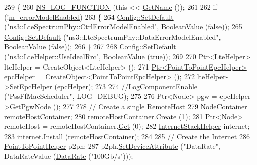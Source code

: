 \begin{DoxyCode}
259 \{
260   \hyperlink{log-macros-disabled_8h_a90b90d5bad1f39cb1b64923ea94c0761}{NS\_LOG\_FUNCTION} (\textcolor{keyword}{this} << \hyperlink{classns3_1_1TestCase_a28f7bb59669c24dae1c290fc17fc9b62}{GetName} ());
261 
262   \textcolor{keywordflow}{if} (!\hyperlink{classLenaPssFfMacSchedulerTestCase1_a6b9a830f183e1d99a4aa038bba09132a}{m\_errorModelEnabled})
263     \{
264       \hyperlink{group__config_ga2e7882df849d8ba4aaad31c934c40c06}{Config::SetDefault} (\textcolor{stringliteral}{"ns3::LteSpectrumPhy::CtrlErrorModelEnabled"}, 
      \hyperlink{classns3_1_1BooleanValue}{BooleanValue} (\textcolor{keyword}{false}));
265       \hyperlink{group__config_ga2e7882df849d8ba4aaad31c934c40c06}{Config::SetDefault} (\textcolor{stringliteral}{"ns3::LteSpectrumPhy::DataErrorModelEnabled"}, 
      \hyperlink{classns3_1_1BooleanValue}{BooleanValue} (\textcolor{keyword}{false}));
266     \}
267 
268   \hyperlink{group__config_ga2e7882df849d8ba4aaad31c934c40c06}{Config::SetDefault} (\textcolor{stringliteral}{"ns3::LteHelper::UseIdealRrc"}, 
      \hyperlink{classns3_1_1BooleanValue}{BooleanValue} (\textcolor{keyword}{true}));
269 
270   \hyperlink{classns3_1_1Ptr}{Ptr<LteHelper>} lteHelper = CreateObject<LteHelper> ();
271   \hyperlink{classns3_1_1Ptr}{Ptr<PointToPointEpcHelper>}  epcHelper = CreateObject<PointToPointEpcHelper> ();
272   lteHelper->\hyperlink{classns3_1_1LteHelper_a324079a1ccd54ce949786b83d6b95915}{SetEpcHelper} (epcHelper);
273 
274   \textcolor{comment}{//LogComponentEnable ("PssFfMacScheduler", LOG\_DEBUG);}
275 
276   \hyperlink{classns3_1_1Ptr}{Ptr<Node>} pgw = epcHelper->GetPgwNode ();
277 
278   \textcolor{comment}{// Create a single RemoteHost}
279   \hyperlink{classns3_1_1NodeContainer}{NodeContainer} remoteHostContainer;
280   remoteHostContainer.\hyperlink{classns3_1_1NodeContainer_a787f059e2813e8b951cc6914d11dfe69}{Create} (1);
281   \hyperlink{classns3_1_1Ptr}{Ptr<Node>} remoteHost = remoteHostContainer.\hyperlink{classns3_1_1NodeContainer_a9ed96e2ecc22e0f5a3d4842eb9bf90bf}{Get} (0);
282   \hyperlink{classns3_1_1InternetStackHelper}{InternetStackHelper} internet;
283   internet.\hyperlink{classns3_1_1InternetStackHelper_a6645b412f31283d2d9bc3d8a95cebbc0}{Install} (remoteHostContainer);
284 
285   \textcolor{comment}{// Create the Internet}
286   \hyperlink{classns3_1_1PointToPointHelper}{PointToPointHelper} p2ph;
287   p2ph.\hyperlink{classns3_1_1PointToPointHelper_a4577f5ab8c387e5528af2e0fbab1152e}{SetDeviceAttribute} (\textcolor{stringliteral}{"DataRate"}, DataRateValue (\hyperlink{classns3_1_1DataRate}{DataRate} (\textcolor{stringliteral}{"100Gb/s"})));

\end{DoxyCode}
